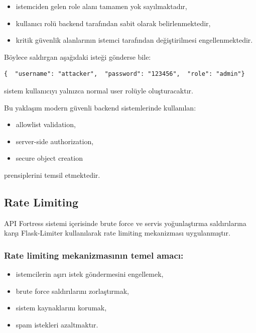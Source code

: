 \begin{itemize}[leftmargin=*]
    \item istemciden gelen role alanı tamamen yok sayılmaktadır,
    \item kullanıcı rolü backend tarafından sabit olarak belirlenmektedir,
    \item kritik güvenlik alanlarının istemci tarafından değiştirilmesi engellenmektedir.
\end{itemize}

Böylece saldırgan aşağıdaki isteği gönderse bile:

\begin{lstlisting}
{  "username": "attacker",  "password": "123456",  "role": "admin"}
\end{lstlisting}

sistem kullanıcıyı yalnızca normal user rolüyle oluşturacaktır.

Bu yaklaşım modern güvenli backend sistemlerinde kullanılan:

\begin{itemize}[leftmargin=*]
    \item allowlist validation,
    \item server-side authorization,
    \item secure object creation
\end{itemize}

prensiplerini temsil etmektedir.

\subsection{Rate Limiting}
\label{rate-limiting}

API Fortress sistemi içerisinde brute force ve servis yoğunlaştırma saldırılarına karşı Flask-Limiter kullanılarak rate limiting mekanizması uygulanmıştır.

\subsubsection{Rate limiting mekanizmasının temel amacı:}

\begin{itemize}[leftmargin=*]
    \item istemcilerin aşırı istek göndermesini engellemek,
    \item brute force saldırılarını zorlaştırmak,
    \item sistem kaynaklarını korumak,
    \item spam istekleri azaltmaktır.
\end{itemize}

